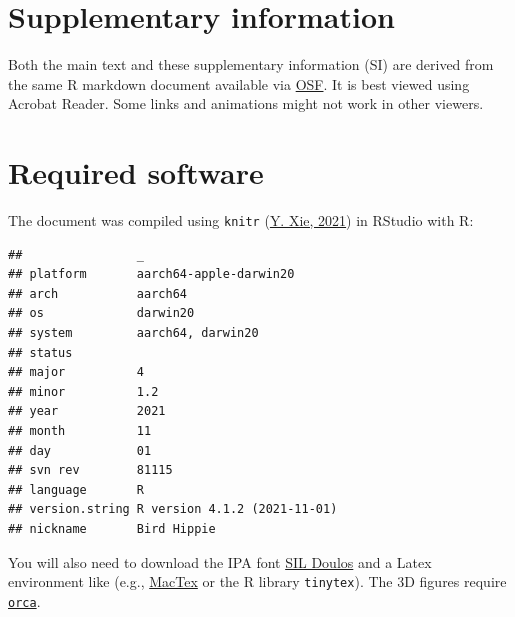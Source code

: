 \documentclass[
  11pt,
  english,
  man,floatsintext]{apa6}
\begin{document}
\endgroup

\newpage
\renewcommand{\thesection}{\S \arabic{section}}

\hypertarget{supplementary-information}{%
\section*{Supplementary information}\label{supplementary-information}}

\setcounter{section}{1}

Both the main text and these supplementary information (SI) are derived from the same R markdown document available via \href{https://osf.io/q7gjp/}{OSF}. It is best viewed using Acrobat Reader. Some links and animations might not work in other viewers.

\hypertarget{sec:SI-software}{%
\section{Required software}\label{sec:SI-software}}

The document was compiled using \texttt{knitr} (\protect\hyperlink{ref-xie2021}{Y. Xie, 2021}) in RStudio with R:

\begin{verbatim}
##                _                           
## platform       aarch64-apple-darwin20      
## arch           aarch64                     
## os             darwin20                    
## system         aarch64, darwin20           
## status                                     
## major          4                           
## minor          1.2                         
## year           2021                        
## month          11                          
## day            01                          
## svn rev        81115                       
## language       R                           
## version.string R version 4.1.2 (2021-11-01)
## nickname       Bird Hippie
\end{verbatim}

You will also need to download the IPA font \href{https://software.sil.org/doulos/download/}{SIL Doulos} and a Latex environment like (e.g., \href{https://tug.org/mactex/mactex-download.html}{MacTex} or the R library \texttt{tinytex}). The 3D figures require \href{https://github.com/plotly/orca\#installation}{\texttt{orca}}.
\end{document}
